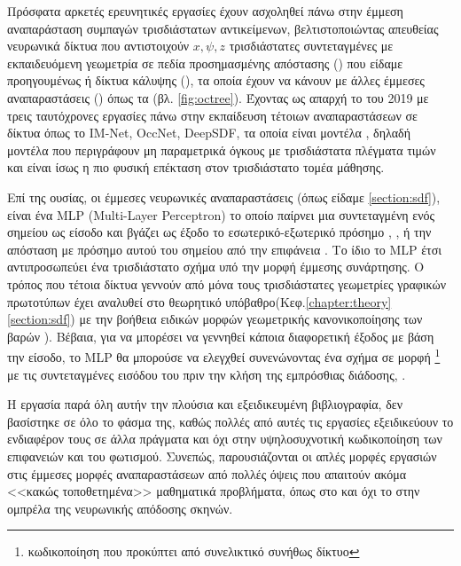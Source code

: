 \par 
    Πρόσφατα αρκετές ερευνητικές εργασίες έχουν ασχοληθεί πάνω στην έμμεση αναπαράσταση συμπαγών τρισδιάστατων αντικείμενων, βελτιστοποιώντας απευθείας νευρωνικά δίκτυα που αντιστοιχούν $x,\psi,z$ τρισδιάστατες συντεταγμένες με εκπαιδευόμενη γεωμετρία σε πεδία προσημασμένης απόστασης () που είδαμε προηγουμένως ή δίκτυα κάλυψης (), τα οποία έχουν να κάνουν με άλλες έμμεσες αναπαραστάσεις () όπως τα  (βλ. \ref{fig:octree}). Έχοντας ως απαρχή το  του 2019 με τρεις ταυτόχρονες εργασίες πάνω στην εκπαίδευση τέτοιων αναπαραστάσεων σε δίκτυα όπως το IM-Net\cite{Chen_2019_CVPR}, OccNet\cite{sima2023scene}, DeepSDF\cite{park2019deepsdf}, τα οποία είναι μοντέλα , δηλαδή μοντέλα που περιγράφουν μη παραμετρικά
    όγκους με τρισδιάστατα πλέγματα τιμών και είναι ίσως η πιο φυσική επέκταση στον τρισδιάστατο τομέα μάθησης.
\par
    Επί της ουσίας, οι έμμεσες νευρωνικές αναπαραστάσεις (όπως είδαμε \ref{section:sdf}), είναι ένα MLP (Multi-Layer Perceptron) το οποίο παίρνει μια συντεταγμένη ενός σημείου ως είσοδο και βγάζει ως έξοδο το εσωτερικό-εξωτερικό πρόσημο \cite{Chen_2019_CVPR}, \cite{mescheder2019occupancy}, ή την απόσταση με πρόσημο αυτού του σημείου από την επιφάνεια \cite{park2019deepsdf}. Το ίδιο το MLP έτσι αντιπροσωπεύει ένα τρισδιάστατο σχήμα υπό την μορφή έμμεσης συνάρτησης. Ο τρόπος που τέτοια δίκτυα γεννούν από μόνα τους τρισδιάστατες γεωμετρίες γραφικών πρωτοτύπων έχει αναλυθεί στο θεωρητικό υπόβαθρο(Κεφ.\ref{chapter:theory} \ref{section:sdf}) με την βοήθεια ειδικών μορφών γεωμετρικής κανονικοποίησης των βαρών ).  Βέβαια, για να μπορέσει να γεννηθεί κάποια διαφορετική έξοδος με βάση την είσοδο, το MLP θα μπορούσε να ελεγχθεί συνενώνοντας ένα σχήμα σε μορφή  \footnote{κωδικοποίηση που προκύπτει από συνελικτικό συνήθως δίκτυο } με τις συντεταγμένες εισόδου του πριν την κλήση της εμπρόσθιας διάδοσης\cite{peng2020convolutional}, \cite{chibane2020implicit}. 

\par
     Η εργασία παρά όλη αυτήν την πλούσια και εξειδικευμένη βιβλιογραφία, δεν βασίστηκε σε όλο το φάσμα της, καθώς πολλές από αυτές τις εργασίες εξειδικεύουν το ενδιαφέρον τους σε άλλα πράγματα και όχι στην υψηλοσυχνοτική κωδικοποίηση των επιφανειών και του φωτισμού. Συνεπώς, παρουσιάζονται οι απλές μορφές εργασιών στις έμμεσες μορφές αναπαραστάσεων από πολλές όψεις που απαιτούν ακόμα <<κακώς τοποθετημένα>> μαθηματικά προβλήματα, όπως στο  και όχι το  στην ομπρέλα της νευρωνικής απόδοσης σκηνών.
     
